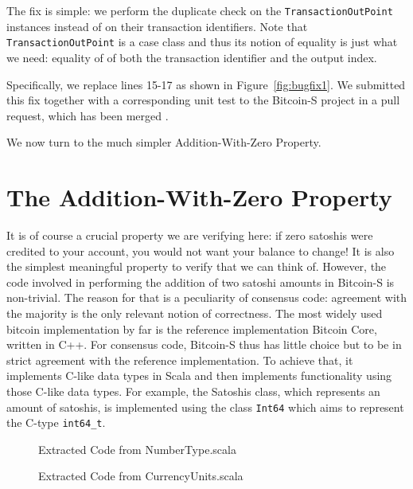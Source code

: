 \documentclass[hyphens, a4paper,USenglish,cleveref, autoref, thm-restate]{oasics-v2019}
\begin{document}
The fix is simple: we perform the duplicate check on the
\texttt{TransactionOutPoint} instances instead of on their transaction
identifiers. Note that \texttt{TransactionOutPoint} is a case class
and thus its notion of equality is just what we need: equality of of
both the transaction identifier and the output index.

Specifically, we replace lines 15-17 as shown in
Figure~\ref{fig:bugfix1}. We submitted this fix together with a
corresponding unit test to the Bitcoin-S project in a pull request,
which has been merged \cite{BitcoinS:pull435}.

We now turn to the much simpler Addition-With-Zero Property.





\section{The Addition-With-Zero Property}

It is of course a crucial property we are verifying here: if zero
satoshis were credited to your account, you would not want your
balance to change! It is also the simplest meaningful property to
verify that we can think of. However, the code involved in performing
the addition of two satoshi amounts in Bitcoin-S is non-trivial. The
reason for that is a peculiarity of consensus code: agreement with the
majority is the only relevant notion of correctness. The most widely
used bitcoin implementation by far is the reference implementation
Bitcoin Core, written in C++. For consensus code, Bitcoin-S thus has
little choice but to be in strict agreement with the reference
implementation. To achieve that, it implements C-like data types in
Scala and then implements functionality using those C-like data
types. For example, the Satoshis class, which represents an amount of
satoshis, is implemented using the class \texttt{Int64} which aims to
represent the C-type \texttt{int64\_t}.

\begin{figure}

  \caption{Extracted Code from NumberType.scala}
  \label{fig:numbertype}
\end{figure}

\begin{figure}

  \caption{Extracted Code from CurrencyUnits.scala}
  \label{fig:currencyunits}
\end{figure}
\end{document}
